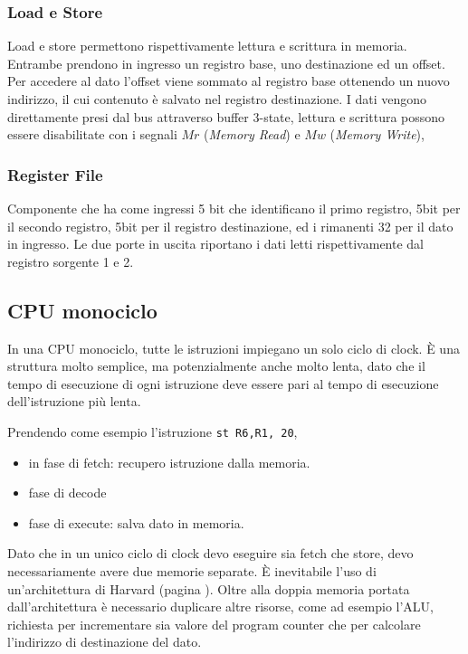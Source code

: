 \documentclass[../ace.tex]{subfiles}
\begin{document}
\subsubsection{Load e Store}
Load e store permettono rispettivamente lettura e scrittura in memoria.
Entrambe prendono in ingresso un registro base, uno destinazione ed un offset. Per accedere al dato l'offset viene sommato
al registro base ottenendo un nuovo indirizzo, il cui contenuto è salvato nel registro destinazione.
I dati vengono direttamente presi dal bus attraverso buffer 3-state, lettura e scrittura possono essere disabilitate con i segnali
$Mr$ (\textit{Memory Read}) e $Mw$ (\textit{Memory Write}),

\subsubsection{Register File}
Componente che ha come ingressi 5 bit che identificano il primo registro, 5bit per il secondo registro,
5bit per il registro destinazione, ed i rimanenti 32 per il dato in ingresso.
Le due porte in uscita riportano i dati letti rispettivamente dal registro sorgente 1 e 2.

\subsection{CPU monociclo}
In una CPU monociclo, tutte le istruzioni impiegano un solo ciclo di clock. È una struttura molto semplice, ma potenzialmente anche molto
lenta, dato che il tempo di esecuzione di ogni istruzione deve essere pari al tempo di esecuzione dell'istruzione più lenta.

Prendendo come esempio l'istruzione \lstinline{st R6,R1, 20},
\begin{itemize}
    \item in fase di fetch: recupero istruzione dalla memoria.
    \item fase di decode
    \item fase di execute: salva dato in memoria.
\end{itemize}

\def\tmono{T_\text{mono}}
\def\tmulti{T_\text{multi}}

Dato che in un unico ciclo di clock devo eseguire sia fetch che store, devo necessariamente avere due memorie separate.
È inevitabile l'uso di un'architettura di Harvard (pagina \pageref{sec:architettura_harvard}).
Oltre alla doppia memoria portata dall'architettura è necessario duplicare altre risorse, come ad esempio l'ALU, richiesta
per incrementare sia valore del program counter che per calcolare l'indirizzo di destinazione del dato.
\end{document}

